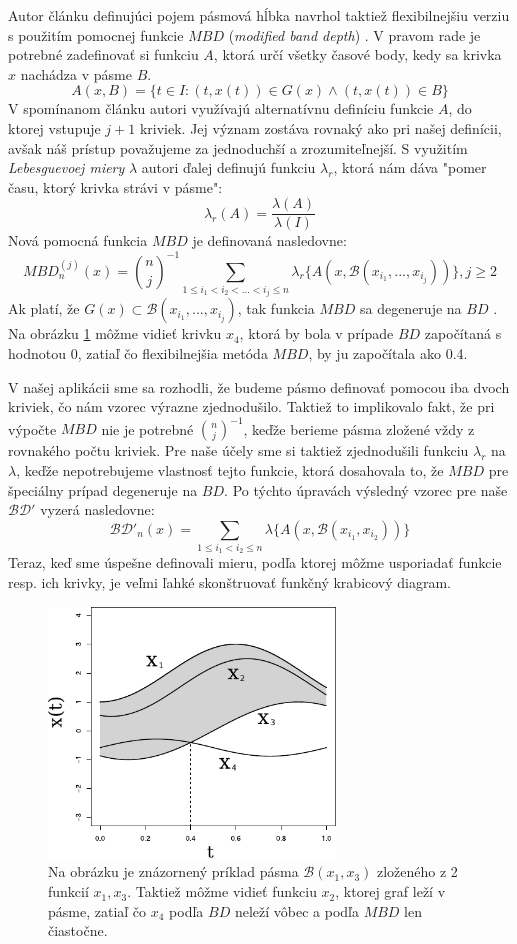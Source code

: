 Autor článku definujúci pojem pásmová hĺbka navrhol taktiež flexibilnejšiu verziu s použitím pomocnej funkcie $ MBD $ (\textit{modified band depth}) \cite{BandDepth}. V pravom rade je potrebné zadefinovať si funkciu $ A $, ktorá určí všetky časové body, kedy sa krivka $ x $ nachádza v pásme $ B $.
\[
	A(x, B) = \{ t \in I : (t, x(t)) \in G(x) \wedge (t, x(t)) \in B \}
\]
V spomínanom článku autori využívajú alternatívnu definíciu funkcie $ A $, do ktorej vstupuje $ j + 1 $ kriviek. Jej význam zostáva rovnaký ako pri našej definícii, avšak náš prístup považujeme za jednoduchší a zrozumiteľnejší. S využitím \textit{Lebesguevoej miery} $ \lambda $ autori ďalej definujú funkciu $ \lambda_{r} $, ktorá nám dáva "pomer času, ktorý krivka strávi v pásme":
\[
	\lambda_{r}(A) = \dfrac{\lambda(A)}{\lambda(I)} 
\]
Nová pomocná funkcia $ MBD $ je definovaná nasledovne:
\[
	MBD^{(j)}_{n}(x) = {n \choose j}^{-1} \sum_{1 \leq i_{1} < i_{2} < ... < i_{j} \leq n} \lambda_{r}\{ A(x, \mathcal{B}(x_{i_{1}}, ... ,x_{i_{j}})) \}, j \geq 2
\]
Ak platí, že $ G(x) \subset \mathcal{B}(x_{i_{1}}, ... ,x_{i_{j}}) $, tak funkcia $ MBD $ sa degeneruje na $ BD $ \cite{FunctionalBoxplot}. Na obrázku \ref{fig:band} môžme vidieť krivku $ x_{4} $, ktorá by bola v prípade $ BD $ započítaná s hodnotou 0, zatiaľ čo flexibilnejšia metóda $ MBD $, by ju započítala ako 0.4.

V našej aplikácii sme sa rozhodli, že budeme pásmo definovať pomocou iba dvoch kriviek, čo nám vzorec výrazne zjednodušilo. Taktiež to implikovalo fakt, že pri výpočte $ MBD $ nie je potrebné $ {n \choose j}^{-1} $, keďže berieme pásma zložené vždy z rovnakého počtu kriviek. Pre naše účely sme si taktiež zjednodušili funkciu $ \lambda_{r} $ na $ \lambda $, keďže nepotrebujeme vlastnosť tejto funkcie, ktorá dosahovala to, že $ MBD $ pre špeciálny prípad degeneruje na $ BD $. Po týchto úpravách výsledný vzorec pre naše $ \mathcal{BD}' $ vyzerá nasledovne:
\[
	\mathcal{BD}'_{n}(x) = \sum_{1 \leq i_{1} < i_{2} \leq n} \lambda\{ A(x, \mathcal{B}(x_{i_{1}},x_{i_{2}})) \}
\]
Teraz, keď sme úspešne definovali mieru, podľa ktorej môžme usporiadať funkcie resp. ich krivky, je veľmi ľahké skonštruovať funkčný krabicový diagram.

\begin{figure}
	\centering
	\includegraphics[width = 3in]{band}
	\caption{ Na obrázku je znázornený príklad pásma $ \mathcal{B}(x_{1}, x_{3}) $ zloženého z 2 funkcií $ x_{1}, x_{3} $. Taktiež môžme vidieť funkciu $ x_{2} $, ktorej graf leží v pásme, zatiaľ čo $ x_{4} $ podľa $ BD $ neleží vôbec a podľa $ MBD $ len čiastočne. }
	\label{fig:band}
\end{figure}

